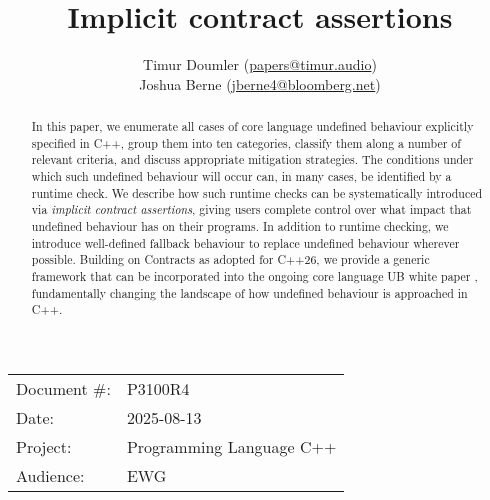 

\title{Implicit contract assertions}
\author{ Timur Doumler \small(\href{mailto:papers@timur.audio}{papers@timur.audio}) 
\\ Joshua Berne \small(\href{mailto:jberne4@bloomberg.net}{jberne4@bloomberg.net})  
}
\date{}
\maketitle

\begin{tabular}{ll}
Document \#: & P3100R4 \\
Date: &2025-08-13 \\
Project: & Programming Language C++ \\
Audience: & EWG
\end{tabular}

\begin{abstract}
In this paper, we enumerate all cases of core language undefined behaviour explicitly specified in C++,  group them into ten categories, classify them along a number of relevant criteria, and discuss appropriate mitigation strategies. The conditions under which such undefined behaviour will occur can, in many cases, be identified by a runtime check. We describe how such runtime checks can be systematically introduced via \emph{implicit contract assertions}, giving users complete control over what impact that undefined behaviour has on their programs. In addition to runtime checking, we introduce well-defined fallback behaviour to replace undefined behaviour wherever possible. Building on Contracts as adopted for C++26, we provide a generic framework that can be incorporated into the ongoing core language UB white paper \cite{P3656R1}, fundamentally changing the landscape of how undefined behaviour is approached in C++.
\end{abstract}


\pagebreak
\tableofcontents*
\pagebreak




